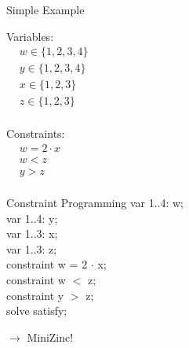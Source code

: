 \documentclass[mathserif,table]{gkibeamer-aaai}
\begin{document}
\begin{frame}{Simple Example}
	\begin{multicols}{2}
		\large{Variables:} \\
		\vspace{0.5cm}
		\hspace{0.5cm}
		$\begin{aligned}
				 & w \in \{1, 2, 3, 4\} \\
				 & y \in \{1, 2, 3, 4\} \\
				 & x \in \{1, 2, 3\}    \\
				 & z \in \{1, 2, 3\}    \\
			\end{aligned}$

		\columnbreak

		\large{Constraints:} \\
		\vspace{0.5cm}
		\hspace{0.5cm}
		$\begin{aligned}
				 & w = 2 \cdot x \\
				 & w < z         \\
				 & y > z         \\
			\end{aligned}$
	\end{multicols}
\end{frame}

\begin{frame}{Constraint Programming}
	\hspace{2cm}
	var 1..4: w; \\
	\hspace{2cm}
	var 1..4: y; \\
	\hspace{2cm}
	var 1..3: x; \\
	\hspace{2cm}
	var 1..3: z; \\
	\vspace{0.35cm}
	\hspace{2cm}
	constraint w = 2 $\cdot$ x; \\
	\hspace{2cm}
	constraint w $<$ z; \\
	\hspace{2cm}
	constraint y $>$ z; \\

	\pause
	\vspace{0.35cm}
	\hspace{2cm}
	solve satisfy;

	\pause
	\vspace{0.35cm}
	\hspace{2cm}
	$\rightarrow$ MiniZinc!
\end{frame}
\end{document}
